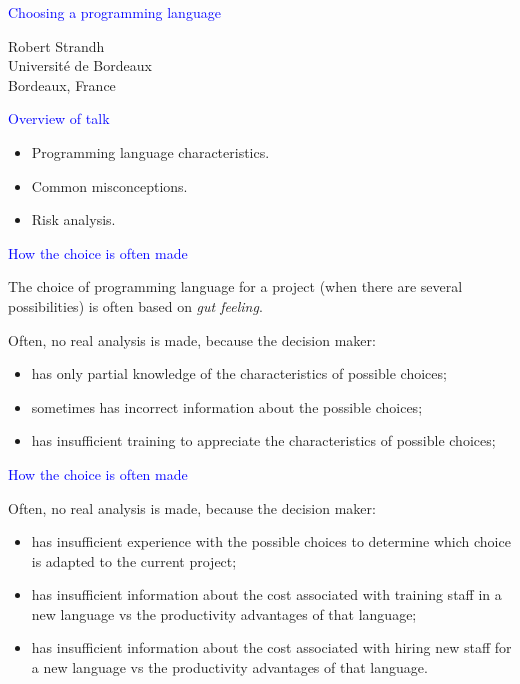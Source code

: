 \documentclass{slides}
\newcommand{\ti}[1]{\begin{center}\Large{\textcolor{blue}{#1}}\end{center}}
\begin{document}
\landscape
\setlength{\oddsidemargin}{1cm}
\setlength{\evensidemargin}{1cm}
\setlength{\marginparwidth}{1cm}
\setlength{\parskip}{0.5cm}
\setlength{\parindent}{0cm}
\begin{slide}\ti{Choosing a programming language}
\vskip 0.5cm
\begin{center}
Robert Strandh \\
Université de Bordeaux \\
Bordeaux, France
\end{center}
\vfill\end{slide}
\begin{slide}\ti{Overview of talk}

  \begin{itemize}
  \item Programming language characteristics.
  \item Common misconceptions.
  \item Risk analysis.
  \end{itemize}

\vfill\end{slide}
\begin{slide}\ti{How the choice is often made}

The choice of programming language for a project (when there are
several possibilities) is often based on \emph{gut feeling}.

Often, no real analysis is made, because the decision maker:

\begin{itemize}
\item has only partial knowledge of the characteristics of possible
  choices;
\item sometimes has incorrect information about the possible choices;
\item has insufficient training to appreciate the characteristics of
  possible choices;
\end{itemize}

\vfill\end{slide}
\begin{slide}\ti{How the choice is often made}

Often, no real analysis is made, because the decision maker:

\begin{itemize}
\item has insufficient experience with the possible choices to
  determine which choice is adapted to the current project;
\item has insufficient information about the cost associated with
  training staff in a new language vs the productivity advantages of
  that language;
\item has insufficient information about the cost associated with
  hiring new staff for a new language vs the productivity advantages of
  that language.
\end{itemize}

\vfill\end{slide}
\end{document}
